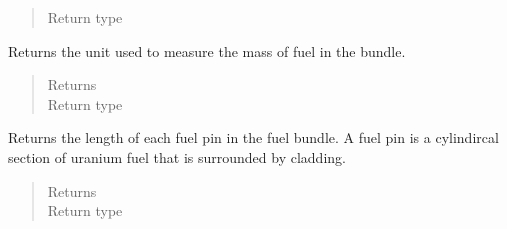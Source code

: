 \documentclass[letterpaper,10pt,openany,oneside,english]{sphinxmanual}
\begin{document}
\begin{fulllineitems}
\begin{fulllineitems}
\begin{quote}
\begin{description}
\item[{Return type}] \leavevmode
{}

\end{description}\end{quote}

\end{fulllineitems}


\begin{fulllineitems}
\label{\detokenize{support_rst/fuel_bundle:fuel_bundle.FuelBundle.get_fuel_mass_unit}}
Returns the unit used to measure the mass of fuel in the bundle.
\begin{quote}\begin{description}
\item[{Returns}] \leavevmode
{}

\item[{Return type}] \leavevmode
{}

\end{description}\end{quote}

\end{fulllineitems}


\begin{fulllineitems}
\label{\detokenize{support_rst/fuel_bundle:fuel_bundle.FuelBundle.get_fuel_pin_length}}
Returns the length of each fuel pin in the fuel bundle. A fuel pin is
a cylindircal section of uranium fuel that is surrounded by cladding.
\begin{quote}\begin{description}
\item[{Returns}] \leavevmode
{}

\item[{Return type}] \leavevmode
{}

\end{description}\end{quote}


\end{fulllineitems}
\end{fulllineitems}
\end{document}
